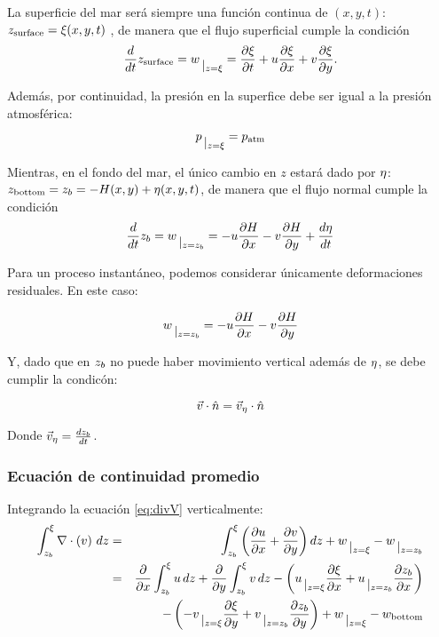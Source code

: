 La superficie del mar será siempre una función continua de $(x,y,t)$: $z_{\operatorname{surface}} = \xi(x,y,t)$
, de manera que el flujo superficial cumple la condición
\begin{equation}
  \label{eq:freeSurfaceFlow}
  \ddt{}z_{\surface} = w \rvert{z=\sup} = \pddt{\sup} + u \pddx{\sup} + v \pddy{\sup}.
\end{equation}

Además, por continuidad, la presión en la superfice debe ser igual a la presión atmosférica:

\begin{equation}
  \label{eq:p_atm-continuity}
  p \rvert{z=\sup} = p_{\atm}
\end{equation}

Mientras, en el fondo del mar, el único cambio en $z$ estará dado por $\eta$: $z_{\operatorname{bottom}} = z_b = -H(x,y) + \eta(x,y,t)$, de manera que el flujo normal cumple la condición
\begin{equation}
  \label{eq:normalFlow}
    \ddt{}\zbot = w \rvert{z=\zbot} = -u \pddx{\down} - v \pddy{\down} + \ddt{\bup}
\end{equation}

Para un proceso instantáneo, podemos considerar únicamente deformaciones residuales. En este caso:

\begin{equation}
  \label{eq:w-bottom-instantaneous}
  w \rvert{z=\zbot} = -u \pddx{\down} - v \pddy{\down}
\end{equation}


Y, dado que en $z_b$ no puede haber movimiento vertical además de $\eta$, se debe cumplir la condicón:

\begin{equation}
  \label{eq:no-normal-flow}
  \vec{v} \cdot \hat{n} = \vec{v}_\eta \cdot \hat{n}
\end{equation}

Donde $\vec{v}_\eta = \frac{d z_b}{dt}$. %

\subsubsection{Ecuación de continuidad promedio}
\label{sec:depth-average-continuity-equation}

Integrando la ecuación \eqref{eq:divV} verticalmente:
\begin{eqnarray}
  \label{eq:2}
  \intver \div{v} \, dz & = & \intver \left( \pddx{u} + \pddy{v} \right) dz + w\rvert{z=\sup} - w \rvert{z=\zbot} \\
                        & = & \pddx{} \intver u \, dz + \pddy{} \intver v \, dz - 
                              \left(
                              u\rvert{z=\sup} \pddx{\sup} + u \rvert{z=\zbot} \pddx{\zbot}
                              \right)\\ & &
  -                              \left( 
  - v \rvert{z=\sup} \pddy{\sup} + v \rvert{z=\zbot} \pddy{\zbot}
  \right)
                                            + w \rvert{z=\sup} - w_{\bottom}
\end{eqnarray}

